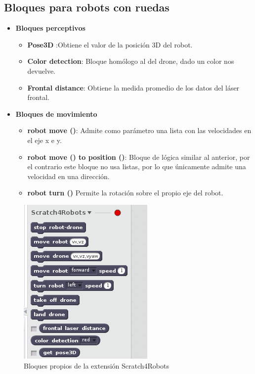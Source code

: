 \subsection{Bloques para robots con ruedas}
\begin{itemize}
\item \textbf{Bloques perceptivos}
	\begin{itemize}
	\item \textbf{Pose3D} :Obtiene el valor de la posición 3D del robot.
	\item \textbf{Color detection}: Bloque homólogo al del drone, dado un color nos devuelve.
	\item \textbf{Frontal distance}: Obtiene la medida promedio de los datos del láser frontal. 
	\end{itemize}
\item \textbf{Bloques de movimiento}
	\begin{itemize}

	\item \textbf{robot move ()}: Admite como parámetro una lista con las velocidades en el eje x e y.
	\item \textbf{robot move () to position ()}: Bloque de lógica similar al anterior, por el contrario este bloque no usa listas, por lo que únicamente admite una velocidad en una dirección.
	\item \textbf{robot turn ()} Permite la rotación sobre el propio eje del robot.

	\end{itemize}
\end{itemize}

\begin{figure}[H]
    \centering
    \includegraphics[scale=0.75]{img/bloques-s4r.png}
  	\caption{Bloques propios de la extensión Scratch4Robots}
  	\label{fig:curiosity}
\end{figure}


